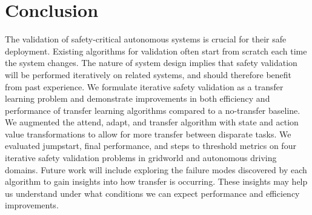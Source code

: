 \section{Conclusion}
The validation of safety-critical autonomous systems is crucial for their safe deployment. Existing algorithms for validation often start from scratch each time the system changes. The nature of system design implies that safety validation will be performed iteratively on related systems, and should therefore benefit from past experience. We formulate iterative safety validation as a transfer learning problem and demonstrate improvements in both efficiency and performance of transfer learning algorithms compared to a no-transfer baseline. We augmented the attend, adapt, and transfer algorithm with state and action value transformations to allow for more transfer between disparate tasks. We evaluated jumpstart, final performance, and steps to threshold metrics on four iterative safety validation problems in gridworld and autonomous driving domains. Future work will include exploring the failure modes discovered by each algorithm to gain insights into how transfer is occurring. These insights may help us understand under what conditions we can expect performance and efficiency improvements.